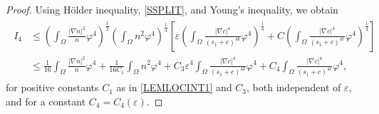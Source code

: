 \documentclass{amsart}
\numberwithin{equation}{section}
\newcommand{\bke}[1]{\left( #1 \right)}
\newcommand{\bkt}[1]{\left[ #1 \right]}
\begin{document}
\begin{proof}
Using H\"{o}lder inequality, \eqref{SSPLIT}, and Young's inequality, we obtain 
\begin{align}\label{TUEMAR18}
\begin{aligned}
I_4 &\le \bke{\int_{\Omega} \frac{|\nabla n|^{2}}{n}\varphi^{4}}^{\frac{1}{2}}
\bke{\int_{\Omega}n^{2}\varphi^{4}}^{\frac{1}{4}}\bkt{\varepsilon\bke{\int_{\Omega}\frac{|\nabla c|^{4}}{(s_{1}+c)^{4k}}\varphi^{4}}^{\frac{1}{4}}+C\bke{\int_{\Omega}\frac{|\nabla c|^{4}}{(s_{1}+c)^{4r}}\varphi^{4}}^{\frac{1}{4}}}
\\&\le\frac{1}{16} \int_{\Omega} \frac{|\nabla n|^{2}}{n}\varphi^{4} +
\frac{1}{16C_{1}}\int_{\Omega}n^{2}\varphi^{4} +   C_{3}\varepsilon^{4}\int_{\Omega}\frac{|\nabla c|^{4}}{(s_{1}+c)^{4k}}\varphi^{4}+C_{4}\int_{\Omega}\frac{|\nabla c|^{4}}{(s_{1}+c)^{4r}}\varphi^{4},
\end{aligned}
\end{align}
for positive constants \(C_1\) as in \eqref{LEMLOCINT1} and \(C_3\), both independent of \(\varepsilon\), and for a constant \(C_4=C_4(\varepsilon)\).





\end{proof}
\end{document}
